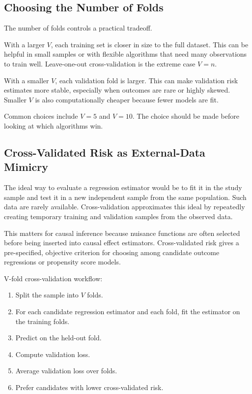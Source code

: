 \subsection{Choosing the Number of Folds}

The number of folds controls a practical tradeoff.

With a larger $V$, each training set is closer in size to the full dataset. This can be
helpful in small samples or with flexible algorithms that need many observations to
train well. Leave-one-out cross-validation is the extreme case $V=n$.

With a smaller $V$, each validation fold is larger. This can make validation risk
estimates more stable, especially when outcomes are rare or highly skewed. Smaller
$V$ is also computationally cheaper because fewer models are fit.

Common choices include $V=5$ and $V=10$. The choice should be made before looking at
which algorithms win.

\subsection{Cross-Validated Risk as External-Data Mimicry}

The ideal way to evaluate a regression estimator would be to fit it in the study
sample and test it in a new independent sample from the same population. Such data
are rarely available. Cross-validation approximates this ideal by repeatedly creating
temporary training and validation samples from the observed data.

This matters for causal inference because nuisance functions are often selected before
being inserted into causal effect estimators. Cross-validated risk gives a pre-specified,
objective criterion for choosing among candidate outcome regressions or propensity
score models.

\begin{estimationbox}
V-fold cross-validation workflow:
\begin{enumerate}
\item Split the sample into $V$ folds.
\item For each candidate regression estimator and each fold, fit the estimator on the
training folds.
\item Predict on the held-out fold.
\item Compute validation loss.
\item Average validation loss over folds.
\item Prefer candidates with lower cross-validated risk.
\end{enumerate}
\end{estimationbox}
